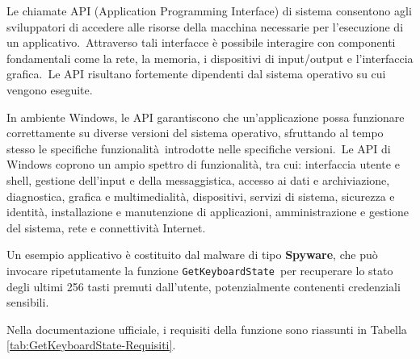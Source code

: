 
Le chiamate API (Application Programming Interface) di sistema consentono agli sviluppatori di accedere alle risorse della macchina necessarie per l'esecuzione di un applicativo.\
Attraverso tali interfacce è possibile interagire con componenti fondamentali come la rete, la memoria, i dispositivi di input/output e l'interfaccia grafica.\
Le API risultano fortemente dipendenti dal sistema operativo su cui vengono eseguite.


In ambiente Windows, le API garantiscono che un'applicazione possa funzionare correttamente su diverse versioni del sistema operativo, sfruttando al tempo stesso le specifiche funzionalità\
introdotte nelle specifiche versioni\cite{Microsoft-api}.\
Le API di Windows coprono un ampio spettro di funzionalità, tra cui: interfaccia utente e shell, gestione dell'input e della messaggistica, accesso ai dati e archiviazione,
diagnostica, grafica e multimedialità, dispositivi, servizi di sistema, sicurezza e identità, installazione e manutenzione di applicazioni, amministrazione e gestione del sistema, rete e connettività Internet.

Un esempio applicativo è costituito dal malware di tipo \textbf{Spyware}, che può invocare ripetutamente la funzione \texttt{GetKeyboardState}\cite{Microsoft-GetKeyboardState}\
per recuperare lo stato degli ultimi 256 tasti premuti dall'utente, potenzialmente contenenti credenziali sensibili.

Nella documentazione ufficiale, i requisiti della funzione sono riassunti in Tabella \ref{tab:GetKeyboardState-Requisiti}.

